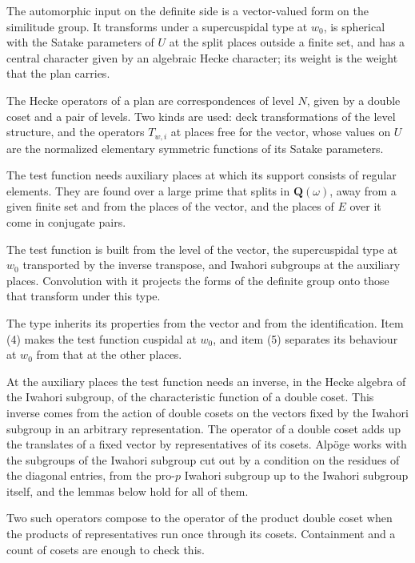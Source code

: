 The automorphic input on the definite side is a vector-valued form on the similitude group. It transforms
under a supercuspidal type at $w_0$, is spherical with the Satake parameters of $U$ at the split places
outside a finite set, and has a central character given by an algebraic Hecke character; its weight is
the weight that the plan carries.

The Hecke operators of a plan are correspondences of level $N$, given by a double coset and a pair of
levels. Two kinds are used: deck transformations of the level structure, and the operators $T_{w,i}$ at
places free for the vector, whose values on $U$ are the normalized elementary symmetric functions of its
Satake parameters.

The test function needs auxiliary places at which its support consists of regular elements. They are
found over a large prime that splits in $\mathbf Q(\omega)$, away from a given finite set and from the
places of the vector, and the places of $E$ over it come in conjugate pairs.

The test function is built from the level of the vector, the supercuspidal type at $w_0$ transported by
the inverse transpose, and Iwahori subgroups at the auxiliary places. Convolution with it projects the
forms of the definite group onto those that transform under this type.

The type inherits its properties from the vector and from the identification. Item (4) makes the test
function cuspidal at $w_0$, and item (5) separates its behaviour at $w_0$ from that at the other places.

At the auxiliary places the test function needs an inverse, in the Hecke algebra of the Iwahori subgroup,
of the characteristic function of a double coset. This inverse comes from the action of double cosets on
the vectors fixed by the Iwahori subgroup in an arbitrary representation. The operator of a double coset
adds up the translates of a fixed vector by representatives of its cosets. Alpöge works with the subgroups
of the Iwahori subgroup cut out by a condition on the residues of the diagonal entries, from the pro-$p$
Iwahori subgroup up to the Iwahori subgroup itself, and the lemmas below hold for all of them.

Two such operators compose to the operator of the product double coset when the products of
representatives run once through its cosets. Containment and a count of cosets are enough to check this.

